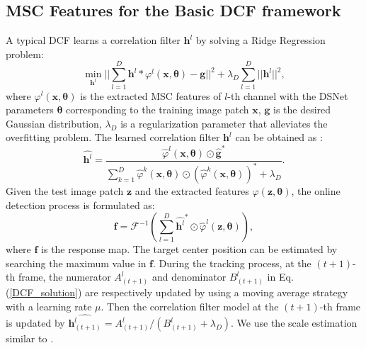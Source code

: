 \documentclass[runningheads]{llncs}
\begin{document}
\subsection{MSC Features for the Basic DCF framework} 
A typical DCF learns a correlation filter $\mathbf{h}^{l}$ by solving a Ridge Regression problem:
\begin{equation}\label{DCF_loss}
 \min_{\mathbf{h}^{l}}  ||\sum_{l=1}^{D} {\mathbf{h}^{l}} \ast \varphi^{l}(\mathbf{x}, \mathbf{\theta})-\mathbf{g}||^{2} + \lambda_{D}\sum_{l=1}^{D}||\mathbf{h}^{l}||^{2},
\end{equation}
where $\varphi^{l}(\mathbf{x}, \mathbf{\theta})$ is the extracted MSC features of $l$-th channel with the DSNet parameters $\mathbf{\theta}$ corresponding to the training image patch $\mathbf{x}$, $\mathbf{g}$ is the desired Gaussian distribution, $\lambda_{D}$ is a regularization parameter that alleviates the overfitting problem. The learned correlation filter $\mathbf{h}^{l}$ can be obtained as \cite{KCF}:
\begin{equation}\label{DCF_solution}
\hat{\mathbf{h}^{l}} = \frac{\hat{\varphi}^{l}(\mathbf{x}, \mathbf{\theta}) \odot \hat{\mathbf{g}}^{\ast}}{\sum_{k=1}^{D}{\hat{\varphi}^{k}(\mathbf{x}, \mathbf{\theta}) \odot (\hat{\varphi}^{k}(\mathbf{x}, \mathbf{\theta}))^{\ast}+\lambda_D}}.
\end{equation}
Given the test image patch $\mathbf{z}$ and the extracted features $\varphi(\mathbf{z}, \mathbf{\theta})$, the online detection process is formulated as:
\begin{equation}\label{Detection}
\mathbf{f} = \mathcal{F}^{-1}(\sum_{l=1}^{D}\hat{\mathbf{h}^{l}}^{\ast} \odot \hat{\varphi}^{l}(\mathbf{z, \mathbf{\theta}})),
\end{equation}
where $\mathbf{f}$ is the response map. The target center position can be estimated by searching the maximum value in $\mathbf{f}$. During the tracking process, at the $(t+1)$-th frame, the numerator $A_{(t+1)}^{l}$ and denominator $B_{(t+1)}^{l}$ in Eq. (\ref{DCF_solution}) are respectively updated by using a moving average strategy with a learning rate $\mu$. Then the correlation filter model at the $(t+1)$-th frame is updated by $\hat{\mathbf{h}^{l}_{(t+1)}} = A_{(t+1)}^{l} / (B_{(t+1)}^{l}+\lambda_{D})$. We use the scale estimation similar to \cite{DCFNet}.
\end{document}
